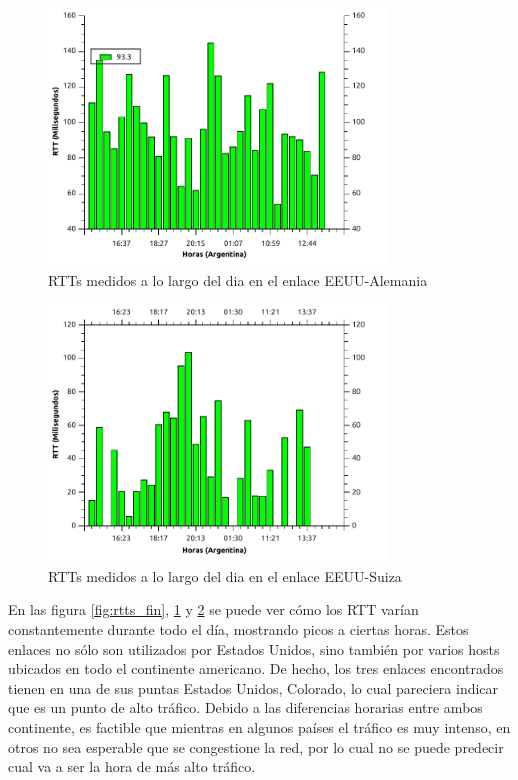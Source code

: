 \begin{figure}[H]
  \centering
    \includegraphics[width=0.8\textwidth]{graficos/rtts_dia_inglaterra.pdf}
    \caption{RTTs medidos a lo largo del dia en el enlace EEUU-Alemania}
    \label{fig:rtts_ing}
\end{figure}

\begin{figure}[H]
  \centering
    \includegraphics[width=0.8\textwidth]{graficos/rtts_dia_finlandia.pdf}
    \caption{RTTs medidos a lo largo del dia en el enlace EEUU-Suiza}
    \label{fig:rtts_sud}
\end{figure}

En las figura \ref{fig:rtts_fin}, \ref{fig:rtts_ing} y \ref{fig:rtts_sud} se puede ver cómo los RTT varían constantemente durante todo el día, mostrando picos a ciertas horas. Estos enlaces no sólo son utilizados por Estados Unidos, sino también por varios hosts ubicados en todo el continente americano. De hecho, los tres enlaces encontrados tienen en una de sus puntas Estados Unidos, Colorado, lo cual pareciera indicar que es un punto de alto tráfico. Debido a las diferencias horarias entre ambos continente, es factible que mientras en algunos países el tráfico es muy intenso, en otros no sea esperable que se congestione la red, por lo cual no se puede predecir cual va a ser la hora de más alto tráfico. \\

